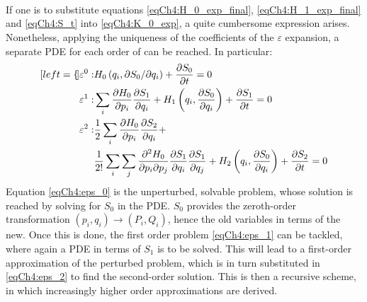 		\paragraph{  \\}
		\indent If one is to substitute equations \eqref{eqCh4:H_0_exp_final}, \eqref{eqCh4:H_1_exp_final} and \eqref{eqCh4:S_t} into \eqref{eqCh4:K_0_exp}, a quite cumbersome expression arises. Nonetheless, applying the uniqueness of the coefficients of the $\varepsilon$ expansion, a separate PDE for each order of can be reached. In particular:
		\begin{alignat}{4}[left = \empheqlbrace]
		\label{eqCh4:eps_0}\varepsilon^0 : & H_0\left( q_i, \partial S_0/\partial q_i\right) + \dfrac{\partial S_0}{\partial t} = 0 \\
		\label{eqCh4:eps_1}\varepsilon^1 : & \dsum_{i} \dfrac{\partial H_0}{\partial p_i} \dfrac{\partial S_1}{\partial q_i} + H_1\left( q_i, \dfrac{\partial S_0}{\partial q_i}\right) + \dfrac{\partial S_1}{\partial t} = 0 \\
		\nonumber \varepsilon^2 : 	& \dfrac{1}{2}\dsum_{i} \dfrac{\partial H_0}{\partial p_i} \dfrac{\partial S_2}{\partial q_i} + \\
		 							& \label{eqCh4:eps_2} \dfrac{1}{2!} \dsum_i \dsum_j \dfrac{\partial^2 H_0}{\partial p_i \partial p_j} \dfrac{\partial S_1}{\partial q_i}\dfrac{\partial S_1}{\partial q_j} + H_2\left( q_i, \dfrac{\partial S_0}{\partial q_i}\right) + \dfrac{\partial S_2}{\partial t} = 0 
		\end{alignat}
		\indent Equation \eqref{eqCh4:eps_0} is the unperturbed, solvable problem, whose solution is reached by solving for $S_0$ in the PDE. $S_0$ provides the zeroth-order transformation $(p_i, q_i) \to (P_i, Q_i)$, hence the old variables in terms of the new. Once this is done, the first order problem \eqref{eqCh4:eps_1} can be tackled, where again a PDE in terms of $S_1$ is to be solved. This will lead to a first-order approximation of the perturbed problem, which is in turn substituted in \eqref{eqCh4:eps_2} to find the second-order solution. This is then a recursive scheme, in which increasingly higher order approximations are derived.\\
